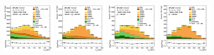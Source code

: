 \begin{figure}[h!]
\center
\includegraphics[width=0.24\textwidth]{Images/VH/SRsandTopCRs/Region_distmBB_DtopCRBL_BMax250_L1_Y6051_TTypebl_T1_J2_BMin150_Prefit.png}
\includegraphics[width=0.24\textwidth]{Images/VH/SRsandTopCRs/Region_distmBB_DtopCRBC_BMax250_L1_Y6051_TTypebt_T1_J2_BMin150_Prefit.png}
\includegraphics[width=0.24\textwidth]{Images/VH/SRsandTopCRs/Region_distmBB_DtopCRBL_L1_Y6051_TTypebl_T1_J2_BMin250_Prefit.png}
\includegraphics[width=0.24\textwidth]{Images/VH/SRsandTopCRs/Region_distmBB_DtopCRBC_L1_Y6051_TTypebt_T1_J2_BMin250_Prefit.png}\\


\end{figure}
